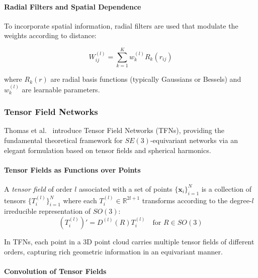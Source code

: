 \paragraph{Radial Filters and Spatial Dependence}

To incorporate spatial information, radial filters are used that modulate the weights according to distance:

\begin{equation}
W_{ij}^{(l)} = \sum_{k=1}^{K} w_k^{(l)} R_k(r_{ij})
\end{equation}

where $R_k(r)$ are radial basis functions (typically Gaussians or Bessels) and $w_k^{(l)}$ are learnable parameters.

\subsubsection{Tensor Field Networks}

Thomas et al.~\citep{thomas2018tensorfieldnetworks} introduce Tensor Field Networks (TFNs), providing the fundamental theoretical framework for $SE(3)$-equivariant networks via an elegant formulation based on tensor fields and spherical harmonics.

\paragraph{Tensor Fields as Functions over Points}

\begin{definition}\label{def:tensor_field}
A \textit{tensor field} of order $l$ associated with a set of points $\{\mathbf{x}_i\}_{i=1}^N$ is a collection of tensors $\{T_i^{(l)}\}_{i=1}^N$ where each $T_i^{(l)} \in \mathbb{R}^{2l+1}$ transforms according to the degree-$l$ irreducible representation of $SO(3)$:
\begin{equation}
(T_i^{(l)})' = D^{(l)}(R) T_i^{(l)} \quad \text{for } R \in SO(3)
\end{equation}
\end{definition}

In TFNs, each point in a 3D point cloud carries multiple tensor fields of different orders, capturing rich geometric information in an equivariant manner.

\paragraph{Convolution of Tensor Fields}

